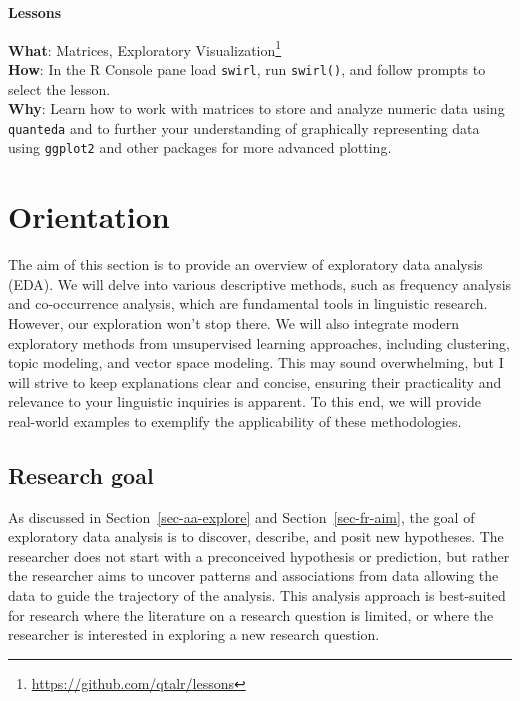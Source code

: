 \documentclass[
  letterpaper,
  DIV=11,
  numbers=noendperiod]{scrreport}
\theoremstyle{definition}
\theoremstyle{remark}
\DeclareRobustCommand{\href}[2]{#2\footnote{\url{#1}}}
\begin{document}
\begin{tcolorbox}[enhanced jigsaw, breakable, colback=white, rightrule=.15mm, arc=.35mm, left=2mm, toprule=.15mm, leftrule=.75mm, bottomrule=.15mm, opacityback=0]

\textbf{ Lessons}

\textbf{What}: \href{https://github.com/qtalr/lessons}{Matrices,
Exploratory Visualization}\\
\textbf{How}: In the R Console pane load \texttt{swirl}, run
\texttt{swirl()}, and follow prompts to select the lesson.\\
\textbf{Why}: Learn how to work with matrices to store and analyze
numeric data using \texttt{quanteda} and to further your understanding
of graphically representing data using \texttt{ggplot2} and other
packages for more advanced plotting.

\end{tcolorbox}

\hypertarget{sec-eda-orientation}{%
\section{Orientation}\label{sec-eda-orientation}}

The aim of this section is to provide an overview of exploratory data
analysis (EDA). We will delve into various descriptive methods, such as
frequency analysis and co-occurrence analysis, which are fundamental
tools in linguistic research. However, our exploration won't stop there.
We will also integrate modern exploratory methods from unsupervised
learning approaches, including clustering, topic modeling, and vector
space modeling. This may sound overwhelming, but I will strive to keep
explanations clear and concise, ensuring their practicality and
relevance to your linguistic inquiries is apparent. To this end, we will
provide real-world examples to exemplify the applicability of these
methodologies.

\hypertarget{sec-eda-research-goal}{%
\subsection{Research goal}\label{sec-eda-research-goal}}

As discussed in Section~\ref{sec-aa-explore} and
Section~\ref{sec-fr-aim}, the goal of exploratory data analysis is to
discover, describe, and posit new hypotheses. The researcher does not
start with a preconceived hypothesis or prediction, but rather the
researcher aims to uncover patterns and associations from data allowing
the data to guide the trajectory of the analysis. This analysis approach
is best-suited for research where the literature on a research question
is limited, or where the researcher is interested in exploring a new
research question.
\end{document}
